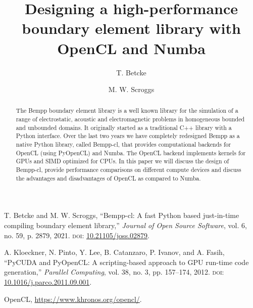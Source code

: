 \documentclass{IEEEcsmag}
\begin{document}

\title{Designing a high-performance boundary element library with OpenCL and Numba}

\author{T. Betcke}

\author{M. W. Scroggs}


\begin{abstract}
The Bempp boundary element library is a well known library for the simulation of a range of electrostatic, acoustic and electromagnetic problems in homogeneous bounded and unbounded domains. It originally started as a traditional C++ library with a Python interface. Over the last two years we have completely redesigned Bempp as a native Python library, called Bempp-cl, that provides computational backends for OpenCL (using PyOpenCL) and Numba. The OpenCL backend implements kernels for GPUs and SIMD optimized for CPUs. In this paper we will discuss the design of Bempp-cl, provide performance comparisons on different compute devices and discuss the advantages and disadvantages of OpenCL as compared to Numba.
\end{abstract}

\maketitle








\begin{thebibliography}{1}

T. Betcke and M. W. Scroggs,
``Bempp-cl: A fast Python based just-in-time compiling boundary element library,''
{\it Journal of Open Source Software}, vol. 6, no. 59, p. 2879, 2021.
\textsc{doi}: \href{https://dx.doi.org/10.21105/joss.02879}{10.21105/joss.02879}.

A. Kloeckner, N. Pinto, Y. Lee, B. Catanzaro, P. Ivanov, and A. Fasih,
``PyCUDA and PyOpenCL: A scripting-based approach to GPU run-time code generation,''
{\it Parallel Computing}, vol. 38, no. 3, pp. 157--174, 2012.
\textsc{doi}: \href{https://dx.doi.org/10.1016/j.parco.2011.09.001}{10.1016/j.parco.2011.09.001}.

OpenCL, \url{https://www.khronos.org/opencl/}.
\end{thebibliography}
\end{document}
